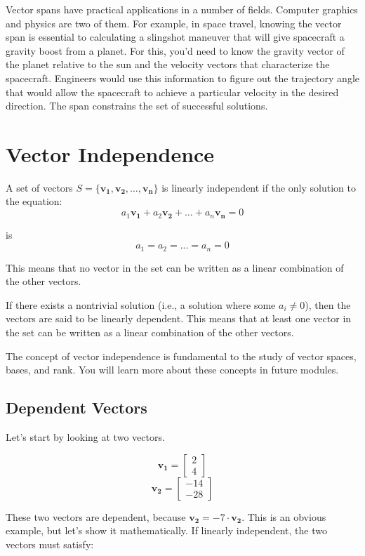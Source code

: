 Vector spans have practical applications in a number of fields. Computer 
graphics and physics are two of them. For example, in space travel, knowing 
the vector span is essential to calculating a slingshot maneuver that will 
give spacecraft a gravity boost from a planet. For this, you'd need to know 
the gravity vector of the planet relative to the sun and the velocity vectors 
that characterize the spacecraft. Engineers would use this information to 
figure out the trajectory angle that would allow the spacecraft to achieve a 
particular velocity in the desired direction. The span constrains the set of 
successful solutions.

\section{Vector Independence}
A set of vectors $S = \{\mathbf{v_1}, \mathbf{v_2}, \dots, \mathbf{v_n}\}$ is 
linearly independent if the only solution to the equation:
$$a_1 \mathbf{v_1} + a_2 \mathbf{v_2} + \dots + a_n \mathbf{v_n} = 0$$

is 
$$a_1 = a_2 = ... = a_n = 0$$ 

This means that no vector in the set can be written as a linear combination of 
the other vectors.

If there exists a nontrivial solution (i.e., a solution where some $a_i \neq 
0$), then the vectors are said to be linearly dependent. This means that at 
least one vector in the set can be written as a linear combination of the 
other vectors.

The concept of vector independence is fundamental to the study of vector 
spaces, bases, and rank. You will learn more about these concepts in future 
modules. 

\subsection{Dependent Vectors}
Let's start by looking at two vectors. 

$$\mathbf{v_1} = \begin{bmatrix}
			2 \\
			4
		\end{bmatrix}$$
$$\mathbf{v_2} = \begin{bmatrix}
			-14 \\
			-28
\end{bmatrix}$$

These two vectors are dependent, because $\mathbf{v_2} = -7 \cdot \mathbf{v_2}$. This is an obvious example, but let's show it mathematically. If linearly independent, the two vectors must satisfy:

